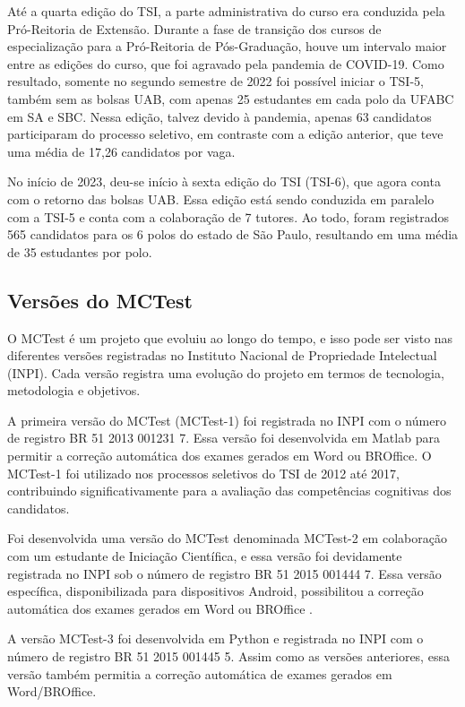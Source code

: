Até a quarta edição do TSI, a parte administrativa do curso era conduzida pela Pró-Reitoria de Extensão. Durante a fase de transição dos cursos de especialização para a Pró-Reitoria de Pós-Graduação, houve um intervalo maior entre as edições do curso, que foi agravado pela pandemia de COVID-19. Como resultado, somente no segundo semestre de 2022 foi possível iniciar o TSI-5, também sem as bolsas UAB, com apenas 25 estudantes em cada polo da UFABC em SA e SBC. Nessa edição, talvez devido à pandemia, apenas 63 candidatos participaram do processo seletivo, em contraste com a edição anterior, que teve uma média de 17,26 candidatos por vaga.

No início de 2023, deu-se início à sexta edição do TSI (TSI-6), que agora conta com o retorno das bolsas UAB. Essa edição está sendo conduzida em paralelo com a TSI-5 e conta com a colaboração de 7 tutores. Ao todo, foram registrados 565 candidatos para os 6 polos do estado de São Paulo, resultando em uma média de 35 estudantes por polo.

\subsection{Versões do MCTest}\label{sec:registrosSoftware}

O MCTest é um projeto que evoluiu ao longo do tempo, e isso pode ser visto nas diferentes versões registradas no Instituto Nacional de Propriedade Intelectual (INPI). Cada versão registra uma evolução do projeto em termos de tecnologia, metodologia e objetivos.

A primeira versão do MCTest (MCTest-1) foi registrada no INPI com o número de registro BR 51 2013 001231 7. Essa versão foi desenvolvida em Matlab para permitir a correção automática dos exames gerados em Word ou BROffice. O MCTest-1 foi utilizado nos processos seletivos do TSI de 2012 até 2017, contribuindo significativamente para a avaliação das competências cognitivas dos candidatos.

Foi desenvolvida uma versão do MCTest denominada MCTest-2 em colaboração com um estudante de Iniciação Científica, e essa versão foi devidamente registrada no INPI sob o número de registro BR 51 2015 001444 7. Essa versão específica, disponibilizada para dispositivos Android, possibilitou a correção automática dos exames gerados em Word ou BROffice \cite{2014:China.Zampirolli,2015:Zampirolli.China.ea,2016:China.Zampirolli.ea}.

A versão MCTest-3 foi desenvolvida em Python e registrada no INPI com o número de registro BR 51 2015 001445 5. Assim como as versões anteriores, essa versão também permitia a correção automática de exames gerados em Word/BROffice.

